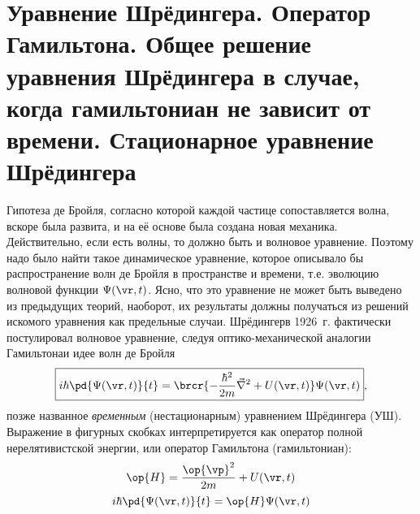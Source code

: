 \begin{sloppypar}
  \section{Уравнение Шрёдингера. Оператор Гамильтона. Общее решение уравнения Шрёдингера в случае, когда гамильтониан не зависит от времени. Стационарное уравнение Шрёдингера}
\end{sloppypar}

Гипотеза де Бройля, согласно которой каждой частице сопоставляется волна, вскоре была развита, и на её основе была создана новая механика. Действительно, если есть волны, то должно быть и волновое уравнение. Поэтому надо было найти такое динамическое уравнение, которое описывало бы распространение волн де Бройля в пространстве и времени, т.е. эволюцию волновой функции $\Psi(\vr, t)$. Ясно, что это уравнение не может быть выведено из предыдущих теорий, наоборот, их результаты должны получаться из решений искомого уравнения как предельные случаи. Шрёдингер\footnotemark в 1926~г. фактически постулировал волновое уравнение, следуя оптико-механической аналогии Гамильтона\footnotemark и идее волн де Бройля
%
\begin{equation}
\label{eq:1_3_1}
\boxed{
  i \hbar \pd{\Psi(\vr,t)}{t} =
    \brcr{-\frac{\hbar^2}{2m}\vec{\nabla}^2 + U(\vr,t)} \Psi(\vr,t)
}, 
\end{equation}%
%
позже названное {\em временным} (нестационарным) уравнением Шрёдингера (УШ). Выражение в фигурных скобках интерпретируется как оператор полной нерелятивистской энергии, или оператор Гамильтона (гамильтониан):
$$
\op{H} = \frac{\op{\vp}^2}{2m} + U(\vr,t)
$$
\begin{equation}
\label{eq:1_3_2}
i \hbar \pd{\Psi(\vr,t)}{t} = \op{H} \Psi(\vr,t)
\end{equation}

